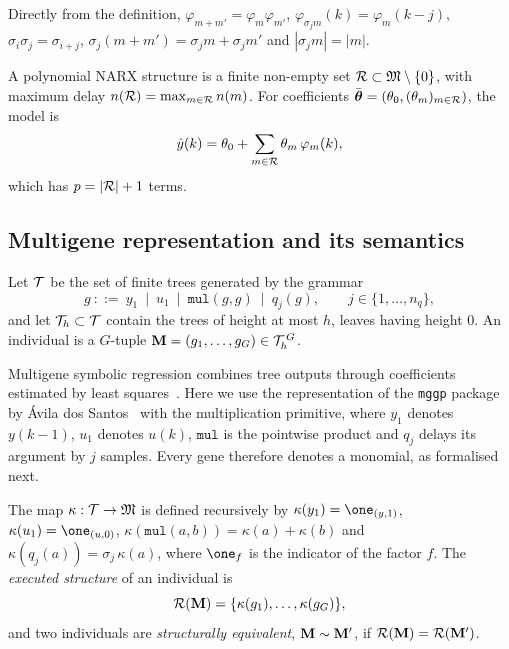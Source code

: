 Directly from the definition, $\varphi_{m+m'}=\varphi_m\varphi_{m'}$, $\varphi_{\sigma_j m}(k)=\varphi_m(k-j)$,
$\sigma_i\sigma_j=\sigma_{i+j}$, $\sigma_j(m+m')=\sigma_j m+\sigma_j m'$ and $|\sigma_j m|=|m|$.

\begin{definition}\label{def:structure}
A polynomial NARX structure is a finite non-empty set $\mathcal{R}\subset\mathfrak{M}\setminus\{0\}$, with maximum delay
$n(\mathcal{R})=\max_{m\in\mathcal{R}}n(m)$. For coefficients $\bar{\boldsymbol\theta}=(\theta_0,(\theta_m)_{m\in\mathcal{R}})$, the model is
\begin{equation}
\hat y(k)=\theta_0+\sum_{m\in\mathcal{R}}\theta_m\,\varphi_m(k),
\label{eq:narx}
\end{equation}
which has $p=|\mathcal{R}|+1$ terms.
\end{definition}

\subsection{Multigene representation and its semantics}

\begin{definition}\label{def:genes}
Let $\mathcal{T}$ be the set of finite trees generated by the grammar
\[
g\ ::=\ y_1\ \mid\ u_1\ \mid\ \texttt{mul}(g,g)\ \mid\ q_j(g),\qquad j\in\{1,\dots,n_q\},
\]
and let $\mathcal{T}_h\subset\mathcal{T}$ contain the trees of height at most $h$, leaves having height $0$. An individual is a
$G$-tuple $\mathbf{M}=(g_1,\dots,g_G)\in\mathcal{T}_h^{\,G}$.
\end{definition}

Multigene symbolic regression combines tree outputs through coefficients estimated by least squares~\cite{Searson2015}. Here we use the representation of the \texttt{mggp} package by {\'A}vila dos Santos~\cite{mggpy} with the multiplication primitive, where
$y_1$ denotes $y(k-1)$, $u_1$ denotes $u(k)$, $\texttt{mul}$ is the pointwise product and $q_j$ delays its argument by
$j$ samples. Every gene therefore denotes a monomial, as formalised next.

\begin{definition}\label{def:kappa}
The map $\kappa:\mathcal{T}\to\mathfrak{M}$ is defined recursively by $\kappa(y_1)=\one_{(y,1)}$, $\kappa(u_1)=\one_{(u,0)}$,
$\kappa(\texttt{mul}(a,b))=\kappa(a)+\kappa(b)$ and $\kappa(q_j(a))=\sigma_j\,\kappa(a)$, where $\one_f$ is the
indicator of the factor $f$. The \emph{executed structure} of an individual is
\begin{equation}
\mathcal{R}(\mathbf{M})=\{\kappa(g_1),\dots,\kappa(g_G)\},
\label{eq:canonical}
\end{equation}
and two individuals are \emph{structurally equivalent}, $\mathbf{M}\sim\mathbf{M}'$, if $\mathcal{R}(\mathbf{M})=\mathcal{R}(\mathbf{M}')$.
\end{definition}

